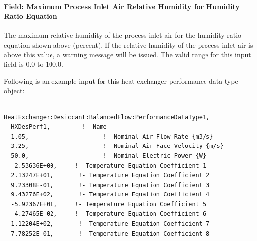\paragraph{Field: Maximum Process Inlet Air Relative Humidity for Humidity Ratio Equation}\label{field-maximum-process-inlet-air-relative-humidity-for-humidity-ratio-equation}

The maximum relative humidity of the process inlet air for the humidity ratio equation shown above (percent). If the relative humidity of the process inlet air is above this value, a warning message will be issued. The valid range for this input field is 0.0 to 100.0.

Following is an example input for this heat exchanger performance data type object:

\begin{lstlisting}

HeatExchanger:Desiccant:BalancedFlow:PerformanceDataType1,
  HXDesPerf1,         !- Name
  1.05,                     !- Nominal Air Flow Rate {m3/s}
  3.25,                     !- Nominal Air Face Velocity {m/s}
  50.0,                     !- Nominal Electric Power {W}
  -2.53636E+00,     !- Temperature Equation Coefficient 1
  2.13247E+01,       !- Temperature Equation Coefficient 2
  9.23308E-01,       !- Temperature Equation Coefficient 3
  9.43276E+02,       !- Temperature Equation Coefficient 4
  -5.92367E+01,     !- Temperature Equation Coefficient 5
  -4.27465E-02,     !- Temperature Equation Coefficient 6
  1.12204E+02,       !- Temperature Equation Coefficient 7
  7.78252E-01,       !- Temperature Equation Coefficient 8



\end{lstlisting}
